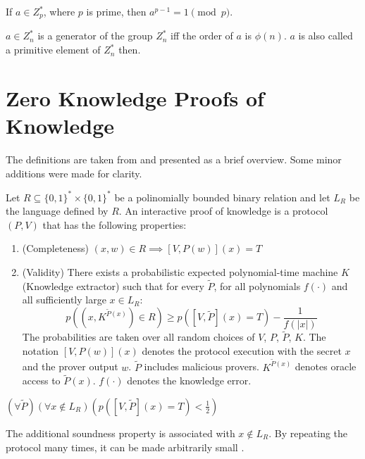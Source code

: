\begin{corr}
  If $a \in Z_p^*$, where $p$ is prime, then $a^{p-1} = 1 \pmod{p}$.  
\end{corr}

\begin{corr}
  $a \in Z_n^*$ is a generator of the group $Z_n^*$ iff the order of
  $a$ is $\phi(n)$. $a$ is also called a primitive element of $Z_n^*$
  then.
\end{corr}

\section{Zero Knowledge Proofs of Knowledge}

The definitions are taken from \cite{Cameni98} and presented as a
brief overview. Some minor additions were made for clarity.

\begin{defn}
  Let $R \subseteq \{0,1\}^* \times \{0,1\}^*$ be a polinomially
  bounded binary relation and let $L_R$ be the language defined by
  $R$. An interactive proof of knowledge is a protocol $(P, V)$ that
  has the following properties:
  \begin{enumerate}
  \item (Completeness) $(x,w) \in R \implies [V, P(w)](x) = T$
  \item (Validity) There exists a probabilistic expected polynomial-time
    machine $K$ (Knowledge extractor) such that for every $\tilde{P}$, for
    all polynomials $f(\cdot)$ and all sufficiently large $x \in L_R$:
    \[
    p((x, K^{\tilde{P}(x)}) \in R) \geq p([V, \tilde{P}](x) = T) -
    \frac{1}{f(|x|)}
    \]
    The probabilities are taken over all random choices of $V$, $P$,
    $\tilde{P}$, $K$. The notation $\left[V, P(w)\right](x)$ denotes
    the protocol execution with the secret $x$ and the prover output
    $w$. $\tilde{P}$ includes malicious provers. $K^{\tilde{P}(x)}$
    denotes oracle access to $\tilde{P}(x)$. $f(\cdot)$ denotes the
    knowledge error.
  \end{enumerate}
\end{defn}

\begin{defn}[Soundness] $(\forall \tilde{P})(\forall x \notin
  L_R)(p([V, \tilde{P}](x) = T) < \frac{1}{2})$
\end{defn}
The additional soundness property is associated with $x \notin L_R$.  By
repeating the protocol many times, it can be made arbitrarily small
\cite{Cameni98}.

